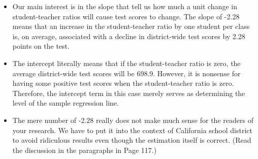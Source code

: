 \documentclass[11pt]{article}
\begin{document}
\begin{itemize}
\item Our main interest is in the slope that tell us how much a unit
change in student-teacher ratios will cause test scores to
change. The slope of -2.28 means that an increase in the
student-teacher ratio by one student per class is, on average,
associated with a decline in district-wide test scores by 2.28
points on the test.
\item The intercept literally means that if the student-teacher ratio is
zero, the average district-wide test scores will be 698.9. However,
it is nonsense for having some positive test scores when the
student-teacher ratio is zero. Therefore, the intercept term in this
case merely serves as determining the level of the sample regression
line.
\item The mere number of -2.28 really does not make much sense for the
readers of your research. We have to put it into the context of
California school district to avoid ridiculous results even though
the estimation itself is correct. (Read the discussion in the
paragraphs in Page 117.)
\end{itemize}
\end{document}
